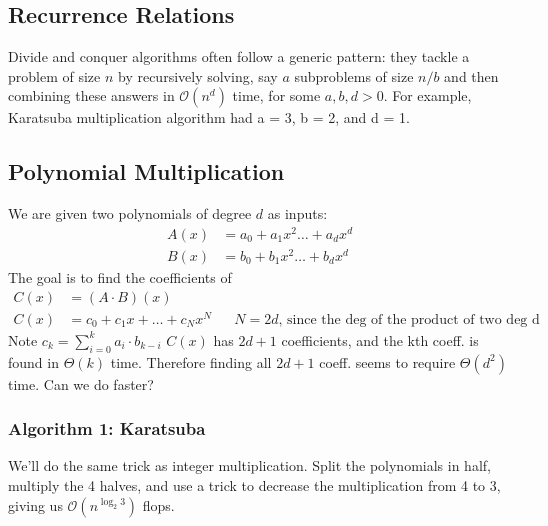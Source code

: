 \documentclass[12pt]{article}
\renewcommand{\O}{\mathcal{O}}
\begin{document}
\subsection*{Recurrence Relations}
Divide and conquer algorithms often follow a generic pattern: they tackle a problem of size $n$ by recursively solving, say $a$ subproblems of size $n/b$ and then combining these answers in $\O(n^d)$ time, for some $a, b, d > 0$. For example, Karatsuba multiplication algorithm had a = 3, b = 2, and d = 1.


\subsection{Polynomial Multiplication}
We are given two polynomials of degree $d$ as inputs:
\begin{align*}
    A(x) & = a_0 + a_1 x^2 \dots + a_d x^d \\
    B(x) & = b_0 + b_1 x^2 \dots + b_d x^d
\end{align*}
The goal is to find the coefficients of
\begin{align*}
    C(x) & = (A\cdot B) (x)                                                                                                             \\
    C(x) & = c_0 + c_1 x + \dots + c_N x^N &  & N = 2d \text{, since the deg of the product of two deg d polynomials is a 2d deg poly.}
\end{align*}
Note $c_k = \sum_{i=0}^{k} a_i \cdot b_{k - i}$
$C(x)$ has $2d + 1$ coefficients, and the kth coeff. is found in $\Theta(k)$ time. Therefore finding all $2d + 1$ coeff. seems to require $\Theta(d^2)$ time. Can we do faster?

\subsubsection{Algorithm 1: Karatsuba}
We'll do the same trick as integer multiplication. Split the polynomials in half, multiply the 4 halves, and use a trick to decrease the multiplication from 4 to 3, giving us $\O(n^{\log_2 3})$ flops.
\end{document}
